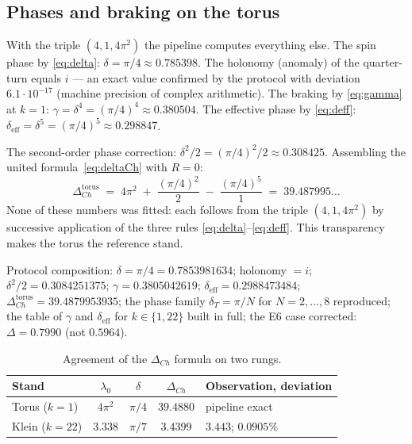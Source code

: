 \subsection{Phases and braking on the torus}

With the triple $(4,1,4\pi^2)$ the pipeline computes everything
else. The spin phase by \eqref{eq:delta}: $\delta=\pi/4
\approx0.785398$. The holonomy (anomaly) of the quarter-turn equals
$i$ --- an exact value confirmed by the protocol with deviation
$6.1\cdot10^{-17}$ (machine precision of complex arithmetic). The
braking by \eqref{eq:gamma} at $k=1$:
$\gamma=\delta^4=(\pi/4)^4\approx0.380504$. The effective phase by
\eqref{eq:deff}: $\delta_{\mathrm{eff}}=\delta^5=(\pi/4)^5
\approx0.298847$.

The second-order phase correction:
$\delta^2/2=(\pi/4)^2/2\approx0.308425$. Assembling the united
formula~\eqref{eq:deltaCh} with $R=0$:
\[
  \Delta_{Ch}^{\mathrm{torus}}
  \;=\; 4\pi^2 \;+\; \frac{(\pi/4)^2}{2} \;-\; \frac{(\pi/4)^5}{1}
  \;=\; 39.487995\ldots
\]
None of these numbers was fitted: each follows from the triple
$(4,1,4\pi^2)$ by successive application of the three rules
\eqref{eq:delta}--\eqref{eq:deff}. This transparency makes the torus
the reference stand.

\begin{databox}
Protocol composition: $\delta=\pi/4=0.7853981634$; holonomy $=i$;
$\delta^2/2=0.3084251375$; $\gamma=0.3805042619$;
$\delta_{\mathrm{eff}}=0.2988473484$;
$\Delta_{Ch}^{\mathrm{torus}}=39.4879953935$; the phase family
$\delta_T=\pi/N$ for $N=2,\dots,8$ reproduced; the table of $\gamma$
and $\delta_{\mathrm{eff}}$ for $k\in\{1,22\}$ built in full; the E6
case corrected: $\Delta=0.7990$ (not $0.5964$).
\end{databox}

\begin{table}[t]
\centering
\caption{Agreement of the $\Delta_{Ch}$ formula on two rungs.}
\label{tab:torus-triples}
\small
\begin{tabularx}{\textwidth}{@{}l c c c >{\raggedright\arraybackslash}X@{}}
\toprule
Stand & $\lambda_0$ & $\delta$ & $\Delta_{Ch}$ & Observation,
deviation \\
\midrule
Torus ($k=1$) & $4\pi^2$ & $\pi/4$ & $39.4880$ & pipeline exact \\
Klein ($k=22$) & $3.338$ & $\pi/7$ & $3.4399$ & $3.443$; $0.0905\%$ \\
\bottomrule
\end{tabularx}
\end{table}

